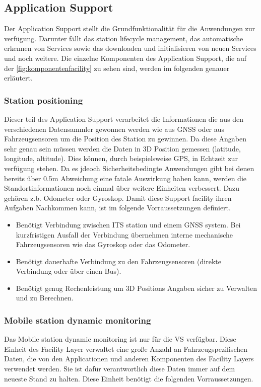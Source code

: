 \subsection{Application Support}
Der Application Support stellt die Grundfunktionalität für die Anwendungen zur verfügung. Darunter fällt das station lifecycle management, das automatische erkennen von Services sowie das downloaden und initialisieren von neuen Services und noch weitere. Die einzelne Komponenten des Application Support, die auf der \autoref{fig:komponentenfacility} zu sehen sind, werden im folgenden genauer erläutert. 

\subsubsection{Station positioning}
Dieser teil des Application Support verarbeitet die Informationen die aus den verschiedenen Datensammler gewonnen werden wie aus GNSS oder aus Fahrzeugsensoren um die Position des Station zu gewinnen. 
Da diese Angaben sehr genau sein müssen werden die Daten in 3D Position gemessen (latitude, longitude, altitude). Dies können, durch beispielsweise GPS, in Echtzeit zur verfügung stehen. Da es jdeoch Sicherheitsbedingte Anwendungen gibt bei denen bereits über 0.5m Abweichung eine fatale Auswirkung haben kann, werden die Standortinformationen noch einmal über weitere Einheiten verbessert. Dazu gehören z.b. Odometer oder Gyroskop.
Damit diese Support facility ihren Aufgaben Nachkommen kann, ist im \cite{etsi102638} folgende Vorraussetzungen definiert.

\begin{itemize}
\item Benötigt Verbindung zwischen ITS station und einem GNSS system. Bei kurzfristigen Ausfall der Verbindung übernehmen interne mechanische Fahrzeugsensoren wie das Gyroskop oder das Odometer.
\item Benötigt dauerhafte Verbindung zu den Fahrzeugsensoren (direkte Verbindung oder über einen Bus).
\item Benötigt genug Rechenleistung um 3D Positions Angaben sicher zu Verwalten und zu Berechnen.
\end{itemize}

\subsubsection{Mobile station dynamic monitoring}
Das Mobile station dynamic monitoring ist nur für die \acs{VS} verfügbar. Diese Einheit des Facility Layer verwaltet eine große Anzahl an Fahrzeugspezifischen Daten, die von den Applicationen und anderen Komponenten des Facility Layers verwendet werden. Sie ist dafür verantwortlich diese Daten immer auf dem neueste  Stand zu halten. 
Diese Einheit benötigt die folgenden Vorraussetzungen.

